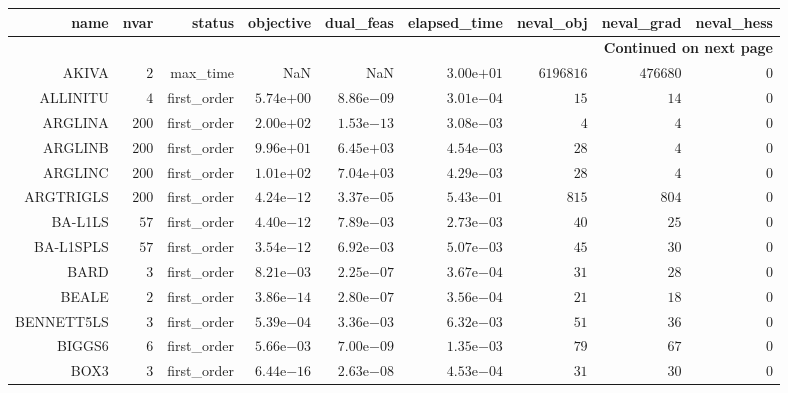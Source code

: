 \begin{longtable}{rrrrrrrrr}
\hline
name & nvar & status & objective & dual\_feas & elapsed\_time & neval\_obj & neval\_grad & neval\_hess \\\hline
\endhead
\hline
\multicolumn{9}{r}{{\bfseries Continued on next page}}\\
\hline
\endfoot
\endlastfoot
AKIVA & \(     2\) & max\_time &       NaN &       NaN & \( 3.00\)e\(+01\) & \(6196816\) & \(476680\) & \(     0\) \\
ALLINITU & \(     4\) & first\_order & \( 5.74\)e\(+00\) & \( 8.86\)e\(-09\) & \( 3.01\)e\(-04\) & \(    15\) & \(    14\) & \(     0\) \\
ARGLINA & \(   200\) & first\_order & \( 2.00\)e\(+02\) & \( 1.53\)e\(-13\) & \( 3.08\)e\(-03\) & \(     4\) & \(     4\) & \(     0\) \\
ARGLINB & \(   200\) & first\_order & \( 9.96\)e\(+01\) & \( 6.45\)e\(+03\) & \( 4.54\)e\(-03\) & \(    28\) & \(     4\) & \(     0\) \\
ARGLINC & \(   200\) & first\_order & \( 1.01\)e\(+02\) & \( 7.04\)e\(+03\) & \( 4.29\)e\(-03\) & \(    28\) & \(     4\) & \(     0\) \\
ARGTRIGLS & \(   200\) & first\_order & \( 4.24\)e\(-12\) & \( 3.37\)e\(-05\) & \( 5.43\)e\(-01\) & \(   815\) & \(   804\) & \(     0\) \\
BA-L1LS & \(    57\) & first\_order & \( 4.40\)e\(-12\) & \( 7.89\)e\(-03\) & \( 2.73\)e\(-03\) & \(    40\) & \(    25\) & \(     0\) \\
BA-L1SPLS & \(    57\) & first\_order & \( 3.54\)e\(-12\) & \( 6.92\)e\(-03\) & \( 5.07\)e\(-03\) & \(    45\) & \(    30\) & \(     0\) \\
BARD & \(     3\) & first\_order & \( 8.21\)e\(-03\) & \( 2.25\)e\(-07\) & \( 3.67\)e\(-04\) & \(    31\) & \(    28\) & \(     0\) \\
BEALE & \(     2\) & first\_order & \( 3.86\)e\(-14\) & \( 2.80\)e\(-07\) & \( 3.56\)e\(-04\) & \(    21\) & \(    18\) & \(     0\) \\
BENNETT5LS & \(     3\) & first\_order & \( 5.39\)e\(-04\) & \( 3.36\)e\(-03\) & \( 6.32\)e\(-03\) & \(    51\) & \(    36\) & \(     0\) \\
BIGGS6 & \(     6\) & first\_order & \( 5.66\)e\(-03\) & \( 7.00\)e\(-09\) & \( 1.35\)e\(-03\) & \(    79\) & \(    67\) & \(     0\) \\
BOX3 & \(     3\) & first\_order & \( 6.44\)e\(-16\) & \( 2.63\)e\(-08\) & \( 4.53\)e\(-04\) & \(    31\) & \(    30\) & \(     0\) \\

\end{longtable}
